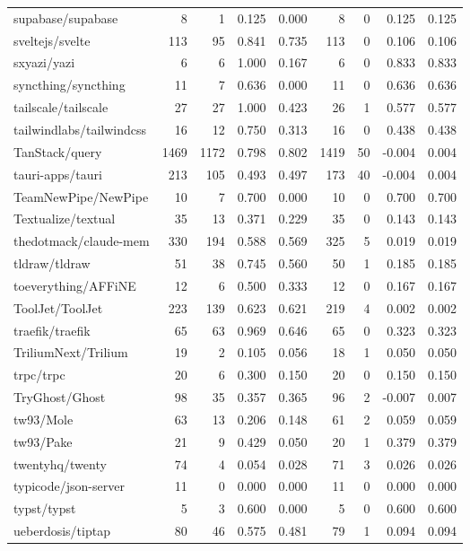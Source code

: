 \begin{tabular}{lrrrrrrrr}
supabase/supabase & 8 & 1 & 0.125 & 0.000 & 8 & 0 & 0.125 & 0.125 \\
sveltejs/svelte & 113 & 95 & 0.841 & 0.735 & 113 & 0 & 0.106 & 0.106 \\
sxyazi/yazi & 6 & 6 & 1.000 & 0.167 & 6 & 0 & 0.833 & 0.833 \\
syncthing/syncthing & 11 & 7 & 0.636 & 0.000 & 11 & 0 & 0.636 & 0.636 \\
tailscale/tailscale & 27 & 27 & 1.000 & 0.423 & 26 & 1 & 0.577 & 0.577 \\
tailwindlabs/tailwindcss & 16 & 12 & 0.750 & 0.313 & 16 & 0 & 0.438 & 0.438 \\
TanStack/query & 1469 & 1172 & 0.798 & 0.802 & 1419 & 50 & -0.004 & 0.004 \\
tauri-apps/tauri & 213 & 105 & 0.493 & 0.497 & 173 & 40 & -0.004 & 0.004 \\
TeamNewPipe/NewPipe & 10 & 7 & 0.700 & 0.000 & 10 & 0 & 0.700 & 0.700 \\
Textualize/textual & 35 & 13 & 0.371 & 0.229 & 35 & 0 & 0.143 & 0.143 \\
thedotmack/claude-mem & 330 & 194 & 0.588 & 0.569 & 325 & 5 & 0.019 & 0.019 \\
tldraw/tldraw & 51 & 38 & 0.745 & 0.560 & 50 & 1 & 0.185 & 0.185 \\
toeverything/AFFiNE & 12 & 6 & 0.500 & 0.333 & 12 & 0 & 0.167 & 0.167 \\
ToolJet/ToolJet & 223 & 139 & 0.623 & 0.621 & 219 & 4 & 0.002 & 0.002 \\
traefik/traefik & 65 & 63 & 0.969 & 0.646 & 65 & 0 & 0.323 & 0.323 \\
TriliumNext/Trilium & 19 & 2 & 0.105 & 0.056 & 18 & 1 & 0.050 & 0.050 \\
trpc/trpc & 20 & 6 & 0.300 & 0.150 & 20 & 0 & 0.150 & 0.150 \\
TryGhost/Ghost & 98 & 35 & 0.357 & 0.365 & 96 & 2 & -0.007 & 0.007 \\
tw93/Mole & 63 & 13 & 0.206 & 0.148 & 61 & 2 & 0.059 & 0.059 \\
tw93/Pake & 21 & 9 & 0.429 & 0.050 & 20 & 1 & 0.379 & 0.379 \\
twentyhq/twenty & 74 & 4 & 0.054 & 0.028 & 71 & 3 & 0.026 & 0.026 \\
typicode/json-server & 11 & 0 & 0.000 & 0.000 & 11 & 0 & 0.000 & 0.000 \\
typst/typst & 5 & 3 & 0.600 & 0.000 & 5 & 0 & 0.600 & 0.600 \\
ueberdosis/tiptap & 80 & 46 & 0.575 & 0.481 & 79 & 1 & 0.094 & 0.094 \\

\end{tabular}
